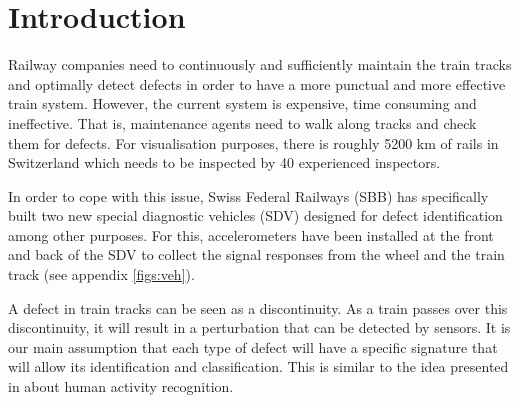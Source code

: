 



%



\maketitle

%
{
  \hypersetup{linkcolor=black}
  \tableofcontents
   
}
\newpage
\chapter{Introduction}
Railway companies need to continuously and sufficiently maintain the train tracks and optimally detect defects in order to have a more punctual and more effective train system. However, the current system is expensive, time consuming and ineffective. That is, maintenance agents need to walk along tracks and check them for defects. For visualisation purposes, there is roughly 5200 km of rails in Switzerland which needs to be inspected by 40 experienced inspectors.


In order to cope with this issue, Swiss Federal Railways (SBB) has specifically built two new special diagnostic vehicles (SDV) designed for defect identification among other purposes. For this, accelerometers have been installed at the front and back of the SDV to collect the signal responses from the wheel and the train track (see appendix \ref{figs:veh}).

A defect in train tracks can be seen as a discontinuity. As a train passes over this discontinuity, it will result in a perturbation that can be detected by sensors. It is our main assumption that each type of defect will have a specific signature that will allow its identification and classification. This is similar to the idea presented in \cite{Introduc31:online} about human activity recognition.

